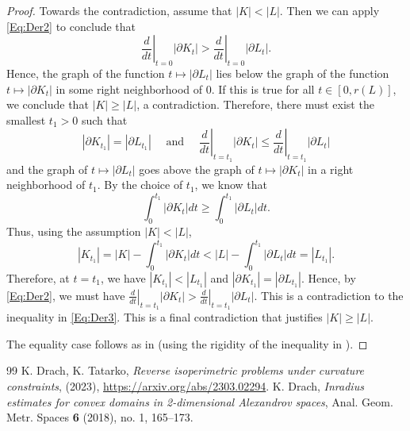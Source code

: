 \documentclass[10pt,a4paper]{amsart}
\renewcommand{\ge}{\geqslant}
\renewcommand{\le}{\leqslant}
\begin{document}
\begin{proof}
Towards the contradiction, assume that $|K| <|L|$. Then we can apply \eqref{Eq:Der2} to conclude that 
\[
\left.\frac{d}{dt}\right|_{t=0}|\partial K_t| >  \left.\frac{d}{dt}\right|_{t=0}|\partial L_t|.
\]
Hence, the graph of the function $t \mapsto |\partial L_t|$ lies below the graph of the function $t \mapsto |\partial K_t|$ in some right neighborhood of $0$. If this is true for all $t \in [0,r(L)]$, we conclude that $|K| \ge |L|$, a contradiction. Therefore, there must exist the smallest $t_1 > 0$ such that 
\begin{equation}
\label{Eq:Der3}    
|\partial K_{t_1}| = |\partial L_{t_1}| \quad \text{ and }\quad \left.\frac{d}{dt}\right|_{t=t_1}|\partial K_t| \le   \left.\frac{d}{dt}\right|_{t=t_1}|\partial L_t|
\end{equation}
and the graph of $t \mapsto |\partial L_t|$ goes above the graph of $t \mapsto |\partial K_t|$ in a right neighborhood of $t_1$. By the choice of $t_1$, we know that 
\[
\int_0^{t_1}|\partial K_t|dt \ge \int_0^{t_1}|\partial L_t|dt. 
\]
Thus, using the assumption $|K| < |L|$,
\[
|K_{t_1}| = |K| - \int_0^{t_1}|\partial K_t|dt < |L| - \int_0^{t_1}|\partial L_t|dt = |L_{t_1}|.
\]
Therefore, at $t = t_1$, we have $|K_{t_1}| < |L_{t_1}|$ and $|\partial K_{t_1}| = |\partial L_{t_1}|$. Hence, by \eqref{Eq:Der2}, we must have $\left.\frac{d}{dt}\right|_{t=t_1}|\partial K_t| >  \left.\frac{d}{dt}\right|_{t=t_1}|\partial L_t|$. This is a contradiction to the inequality in \eqref{Eq:Der3}. This is a final contradiction that justifies $|K| \ge |L|$.

The equality case follows as in \cite{DT} (using the rigidity of the inequality in \cite{Dr}).
\end{proof}

\begin{thebibliography}{99}
 K. Drach, K. Tatarko, \emph{Reverse isoperimetric problems under curvature constraints}, (2023), \url{https://arxiv.org/abs/2303.02294}.
 K. Drach, \emph{Inradius estimates for convex domains in 2-dimensional Alexandrov spaces}, Anal. Geom. Metr. Spaces \textbf{6} (2018), no. 1, 165--173.
\end{thebibliography}
\end{document}
